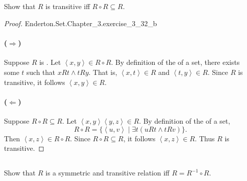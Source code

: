 \documentclass{report}
\newcommand{\pair}[1]{\left< #1 \right>}
\begin{document}
\subsection{}%

Show that $R$ is transitive iff $R \circ R \subseteq R$.

\begin{proof}

    {Enderton.Set.Chapter\_3.exercise\_3\_32\_b}

  \paragraph{($\Rightarrow$)}%

    Suppose $R$ is .
    Let $\pair{x, y} \in R \circ R$.
    By definition of the  of a set,
      there exists some $t$ such that $xRt \land tRy$.
    That is, $\pair{x, t} \in R$ and $\pair{t, y} \in R$.
    Since $R$ is transitive, it follows $\pair{x, y} \in R$.

  \paragraph{($\Leftarrow$)}%

    Suppose $R \circ R \subseteq R$.
    Let $\pair{x, y} \pair{y, z} \in R$.
    By definition of the  of a set,
      $$R \circ R = \{\pair{u, v} \mid \exists t(uRt \land tRv)\}.$$
    Then $\pair{x, z} \in R \circ R$.
    Since $R \circ R \subseteq R$, it follows $\pair{x, z} \in R$.
    Thus $R$ is transitive.

\end{proof}

\subsection{}%

Show that $R$ is a symmetric and transitive relation iff $R = R^{-1} \circ R$.
\end{document}
